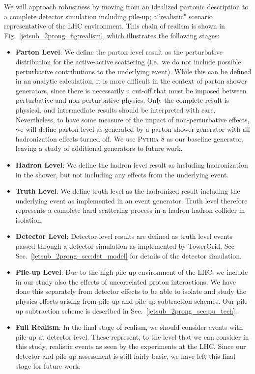 \documentclass[11pt]{cernrep}
\begin{document}
We will approach robustness by moving from an idealized partonic description to a complete detector simulation including pile-up; a``realistic" scenario representative of the LHC environment.
%
This chain of realism is shown in Fig.~\ref{jetsub_2prong_fig:realism}, which illustrates the following stages:
%
\begin{itemize}
\item {\bf Parton Level}: We define the parton level result as the
  perturbative distribution for the active-active scattering (i.e.\ we
  do not include possible perturbative contributions to the underlying
  event).
  While this can be defined in an analytic calculation, it is
  more difficult in the context of parton shower generators, since
  there is necessarily a cut-off that must be imposed between
  perturbative and non-perturbative physics.
  Only the complete result
  is physical, and intermediate results should be interpreted with
  care.
  Nevertheless, to have some measure of the impact of
  non-perturbative effects, we will define parton level as generated
  by a parton shower generator with all hadronization effects turned
  off.
  We use \textsc{Pythia 8} \cite{Sjostrand:2006za,Sjostrand:2007gs} as our baseline generator, leaving a study of additional generators to future work.
%
\item {\bf Hadron Level}: We define the hadron level result as including hadronization in the shower, but not including any effects from the underlying event.
%
\item {\bf Truth Level}:  We define truth level as the hadronized result including the underlying event as implemented in an event generator.
%
Truth level therefore represents a complete hard scattering process in a hadron-hadron collider in isolation.
%
\item {\bf Detector Level}: Detector-level results are defined as truth level events passed through a detector simulation as implemented by TowerGrid.  See Sec.~\ref{jetsub_2prong_sec:det_model} for details of the detector simulation.
%
\item {\bf Pile-up Level}: Due to the high pile-up environment of the LHC, we include in our study also the effects of uncorrelated proton interactions. We have done this separately from detector effects to be able to isolate and study the physics effects arising from pile-up and pile-up subtraction schemes. Our pile-up subtraction scheme is described in Sec.~\ref{jetsub_2prong_sec:pu_tech}.
%
\item {\bf Full Realism}: In the final stage of realism, we should consider events with pile-up at detector
  level.
  These represent, to the level that we can consider in this
  study, realistic events as seen by the experiments at the
  LHC.
  Since our detector and pile-up assessment is still fairly basic, we
  have left this final stage for future work.
\end{itemize}
\end{document}
